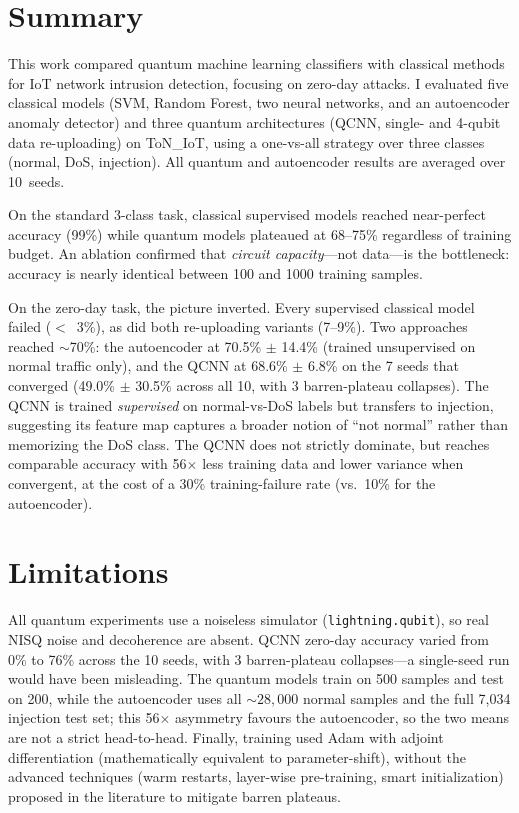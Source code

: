 \documentclass[twoside,openany,a4paper,11pt,english]{report}
\begin{document}
\section*{Summary}

This work compared quantum machine learning classifiers with classical methods for IoT network intrusion detection, focusing on zero-day attacks. I evaluated five classical models (SVM, Random Forest, two neural networks, and an autoencoder anomaly detector) and three quantum architectures (QCNN, single- and 4-qubit data re-uploading) on ToN\_IoT, using a one-vs-all strategy over three classes (normal, DoS, injection). All quantum and autoencoder results are averaged over 10~seeds.

On the standard 3-class task, classical supervised models reached near-perfect accuracy (99\%) while quantum models plateaued at 68--75\% regardless of training budget. An ablation confirmed that \emph{circuit capacity}---not data---is the bottleneck: accuracy is nearly identical between 100 and 1000 training samples.

On the zero-day task, the picture inverted. Every supervised classical model failed ($<$~3\%), as did both re-uploading variants (7--9\%). Two approaches reached $\sim$70\%: the autoencoder at 70.5\% $\pm$ 14.4\% (trained unsupervised on normal traffic only), and the QCNN at 68.6\% $\pm$ 6.8\% on the 7 seeds that converged (49.0\% $\pm$ 30.5\% across all 10, with 3 barren-plateau collapses). The QCNN is trained \emph{supervised} on normal-vs-DoS labels but transfers to injection, suggesting its feature map captures a broader notion of ``not normal'' rather than memorizing the DoS class. The QCNN does not strictly dominate, but reaches comparable accuracy with 56$\times$ less training data and lower variance when convergent, at the cost of a 30\% training-failure rate (vs.\ 10\% for the autoencoder).

\section*{Limitations}

All quantum experiments use a noiseless simulator (\texttt{lightning.qubit}), so real NISQ noise and decoherence are absent. QCNN zero-day accuracy varied from 0\% to 76\% across the 10 seeds, with 3 barren-plateau collapses---a single-seed run would have been misleading. The quantum models train on 500 samples and test on 200, while the autoencoder uses all ${\sim}28{,}000$ normal samples and the full 7,034 injection test set; this 56$\times$ asymmetry favours the autoencoder, so the two means are not a strict head-to-head. Finally, training used Adam with adjoint differentiation (mathematically equivalent to parameter-shift), without the advanced techniques (warm restarts, layer-wise pre-training, smart initialization) proposed in the literature to mitigate barren plateaus.
\end{document}
